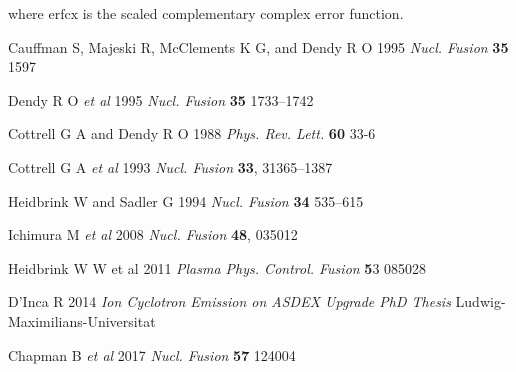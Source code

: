 \documentclass[12pt]{iopart}
\begin{document}
\noindent where $\mathrm{erfcx}$ is the scaled complementary complex error function.

\newpage




\begin{thebibliography}{9}

Cauffman S, Majeski R, McClements K G, and Dendy R O 1995 \textit{Nucl. Fusion} \textbf{35} 1597

  Dendy R O \textit{et al} 1995 \textit{Nucl. Fusion} \textbf{35} 1733–1742

Cottrell G A and Dendy R O 1988 \textit{Phys. Rev. Lett.} \textbf{60} 33-6

Cottrell G A \textit{et al} 1993 \textit{Nucl. Fusion} \textbf{33}, 31365–1387
% 

Heidbrink W and Sadler G 1994 \textit{Nucl. Fusion} \textbf{34} 535–615

Ichimura M \textit{et al} 2008 \textit{Nucl. Fusion} \textbf{48}, 035012

Heidbrink W W et al 2011 \textit{Plasma Phys. Control. Fusion} {\textbf 53} 085028

D’Inca R 2014 \textit{Ion Cyclotron Emission on ASDEX Upgrade PhD Thesis} Ludwig-Maximilians-Universitat

Chapman B \textit{et al} 2017 \textit{Nucl. Fusion} \textbf{57} 124004


\end{thebibliography}
\end{document}
